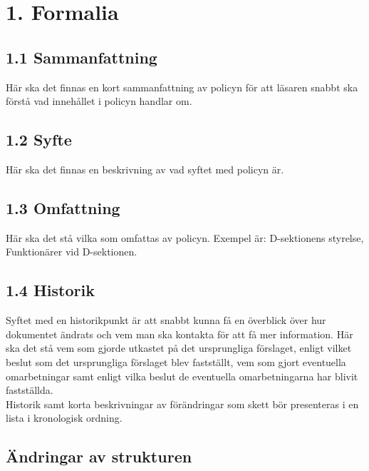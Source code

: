 \documentclass[]{dsekprotokoll}
\begin{document}
\hfill\begin{minipage}{\dimexpr\textwidth-3cm}
    \xdef\tpd{\the\prevdepth}
    \section*{1. Formalia}
    \subsection*{1.1 Sammanfattning}
    Här ska det finnas en kort sammanfattning av policyn för att läsaren
    snabbt ska förstå vad innehållet i policyn handlar om. \\

    \subsection*{1.2 Syfte}
    Här ska det finnas en beskrivning av vad syftet med policyn är. \\

    \subsection*{1.3 Omfattning}
    Här ska det stå vilka som omfattas av policyn. Exempel är: D-sektionens styrelse, Funktionärer vid D-sektionen.\\

    \subsection*{1.4 Historik}
    Syftet med en historikpunkt är att snabbt kunna få en överblick över hur
    dokumentet ändrats och vem man ska kontakta för att få mer
    information. Här ska det stå vem som gjorde utkastet på det ursprungliga
    förslaget, enligt vilket beslut som det ursprungliga förslaget blev fastställt, vem som gjort eventuella omarbetningar samt enligt vilka beslut de
    eventuella omarbetningarna har blivit fastställda.
    \\

    Historik samt korta beskrivningar av förändringar som skett bör presenteras i en lista i kronologisk ordning. \\
\end{minipage}

\prevdepth\tpd

\subsection{Ändringar av strukturen}
\end{document}
